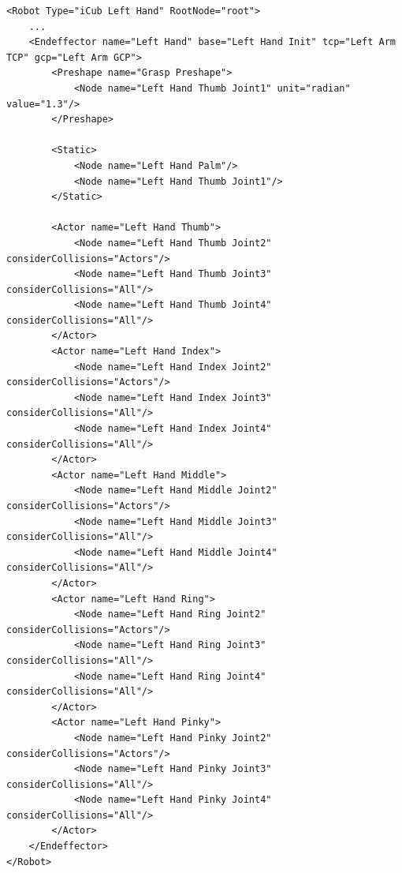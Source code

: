 \begin{lstlisting}
<Robot Type="iCub Left Hand" RootNode="root">
    ...
    <Endeffector name="Left Hand" base="Left Hand Init" tcp="Left Arm TCP" gcp="Left Arm GCP">
        <Preshape name="Grasp Preshape">
            <Node name="Left Hand Thumb Joint1" unit="radian" value="1.3"/>
        </Preshape>

        <Static>
            <Node name="Left Hand Palm"/>
            <Node name="Left Hand Thumb Joint1"/>
        </Static>

        <Actor name="Left Hand Thumb">
            <Node name="Left Hand Thumb Joint2" considerCollisions="Actors"/>
            <Node name="Left Hand Thumb Joint3" considerCollisions="All"/>
            <Node name="Left Hand Thumb Joint4" considerCollisions="All"/>
        </Actor>
        <Actor name="Left Hand Index">
            <Node name="Left Hand Index Joint2" considerCollisions="Actors"/>
            <Node name="Left Hand Index Joint3" considerCollisions="All"/>
            <Node name="Left Hand Index Joint4" considerCollisions="All"/>
        </Actor>
        <Actor name="Left Hand Middle">
            <Node name="Left Hand Middle Joint2" considerCollisions="Actors"/>
            <Node name="Left Hand Middle Joint3" considerCollisions="All"/>
            <Node name="Left Hand Middle Joint4" considerCollisions="All"/>
        </Actor>
        <Actor name="Left Hand Ring">
            <Node name="Left Hand Ring Joint2" considerCollisions="Actors"/>
            <Node name="Left Hand Ring Joint3" considerCollisions="All"/>
            <Node name="Left Hand Ring Joint4" considerCollisions="All"/>
        </Actor>
        <Actor name="Left Hand Pinky">
            <Node name="Left Hand Pinky Joint2" considerCollisions="Actors"/>
            <Node name="Left Hand Pinky Joint3" considerCollisions="All"/>
            <Node name="Left Hand Pinky Joint4" considerCollisions="All"/>
        </Actor>
    </Endeffector>
</Robot>
\end{lstlisting}
\par
